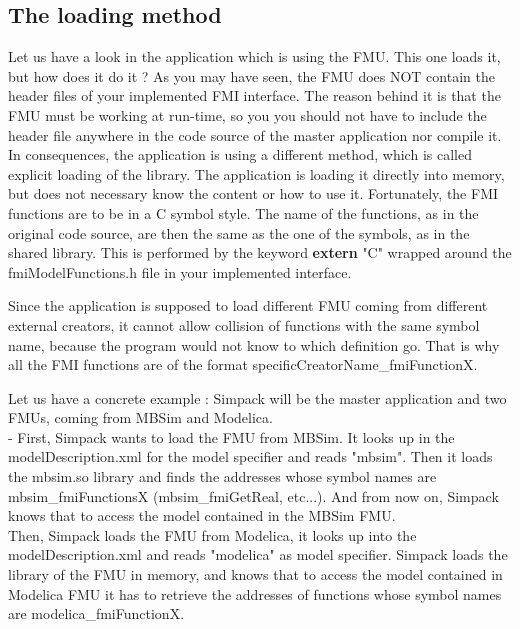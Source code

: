 \documentclass[10pt,a4paper]{report}
\begin{document}
\subsection*{The loading method}
Let us have a look in the application which is using the FMU. This one loads it, but how does it do it ? As you may have seen, the FMU does NOT contain the header files of your implemented FMI interface. The reason behind it is that the FMU must be working at run-time, so you you should not have to include the header file anywhere in the code source of the master application nor compile it. In consequences, the application is using a different method, which is called explicit loading of the library. The application is loading it directly into memory, but does not necessary know the content or how to use it. Fortunately, the FMI functions are to be in a C symbol style. The name of the functions, as in the original code source, are then the same as the one of the symbols, as in the shared library. This is performed by the keyword \textbf{extern} "C" wrapped around the fmiModelFunctions.h file in your implemented interface.\par
%
Since the application is supposed to load different FMU coming from different external creators, it cannot allow collision of functions with the same symbol name, because the program would not know to which definition go. That is why all the FMI functions are of the format specificCreatorName\_fmiFunctionX.\par
%
Let us have a concrete example : Simpack will be the master application and two FMUs, coming from MBSim and Modelica. \\-
First, Simpack wants to load the FMU from MBSim. It looks up in the modelDescription.xml for the model specifier and reads "mbsim". Then it loads the mbsim.so library and finds the addresses whose symbol names are mbsim\_fmiFunctionsX (mbsim\_fmiGetReal, etc...). And from now on, Simpack knows that to access the model contained in the MBSim FMU. \\
Then, Simpack loads the FMU from Modelica, it looks up into the modelDescription.xml and reads "modelica" as model specifier. Simpack loads the library of the FMU in memory, and knows that to access the model contained in Modelica FMU it has to retrieve the addresses of functions whose symbol names are modelica\_fmiFunctionX.
%
\end{document}

